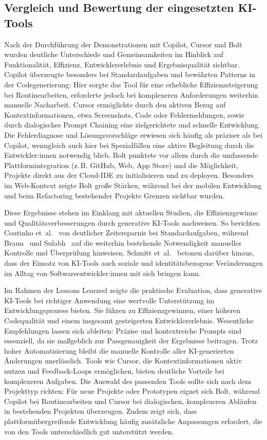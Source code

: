 \subsection{Vergleich und Bewertung der eingesetzten KI-Tools}
\label{sec:vergleich-bewertung}

Nach der Durchführung der Demonstrationen mit Copilot, Cursor und Bolt wurden
deutliche Unterschiede und Gemeinsamkeiten im Hinblick auf Funktionalität,
Effizienz, Entwicklererlebnis und Ergebnisqualität sichtbar. Copilot überzeugte
besonders bei Standardaufgaben und bewährten Patterns in der Codegenerierung:
Hier sorgte das Tool für eine erhebliche Effizienzsteigerung bei
Routinearbeiten, erforderte jedoch bei komplexeren Anforderungen weiterhin
manuelle Nacharbeit. Cursor ermöglichte durch den aktiven Bezug auf
Kontextinformationen, etwa Screenshots, Code oder Fehlermeldungen, sowie durch
dialogisches Prompt Chaining eine zielgerichtete und schnelle Entwicklung. Die
Fehlerdiagnose und Lösungsvorschläge erwiesen sich häufig als präziser als bei
Copilot, wenngleich auch hier bei Spezialfällen eine aktive Begleitung durch
die Entwickler:innen notwendig blieb. Bolt punktete vor allem durch die
umfassende Plattformintegration (z.\,B. GitHub, Web, App Store) und die
Möglichkeit, Projekte direkt aus der Cloud-IDE zu initialisieren und zu
deployen. Besonders im Web-Kontext zeigte Bolt große Stärken, während bei der
mobilen Entwicklung und beim Refactoring bestehender Projekte Grenzen sichtbar
wurden.

Diese Ergebnisse stehen im Einklang mit aktuellen Studien, die Effizienzgewinne
und Qualitätsverbesserungen durch generative KI-Tools nachweisen. So berichten
Coutinho et~al.~\cite{coutinho_role_2024} von deutlicher Zeitersparnis bei
Standardaufgaben, während Braun~\cite{braun_ki_2024} und
Sulabh~\cite{s_future_2024} auf die weiterhin bestehende Notwendigkeit
manueller Kontrolle und Überprüfung hinweisen. Schmitt
et~al.~\cite{schmitt_generative_2024} betonen darüber hinaus, dass der Einsatz
von KI-Tools auch soziale und identitätsbezogene Veränderungen im Alltag von
Softwareentwickler:innen mit sich bringen kann.

Im Rahmen der Lessons Learned zeigte die praktische Evaluation, dass generative
KI-Tools bei richtiger Anwendung eine wertvolle Unterstützung im
Entwicklungsprozess bieten. Sie führen zu Effizienzgewinnen, einer höheren
Codequalität und einem insgesamt gesteigerten Entwicklererlebnis. Wesentliche
Empfehlungen lassen sich ableiten: Präzise und kontextreiche Prompts sind
essenziell, da sie maßgeblich zur Passgenauigkeit der Ergebnisse beitragen.
Trotz hoher Automatisierung bleibt die manuelle Kontrolle aller KI-generierten
Änderungen unerlässlich. Tools wie Cursor, die Kontextinformationen aktiv
nutzen und Feedback-Loops ermöglichen, bieten deutliche Vorteile bei
komplexeren Aufgaben. Die Auswahl des passenden Tools sollte sich nach dem
Projekttyp richten: Für neue Projekte oder Prototypen eignet sich Bolt, während
Copilot bei Routinearbeiten und Cursor bei dialogischen, komplexeren Abläufen
in bestehenden Projekten überzeugen. Zudem zeigt sich, dass
plattformübergreifende Entwicklung häufig zusätzliche Anpassungen erfordert,
die von den Tools unterschiedlich gut unterstützt werden.

